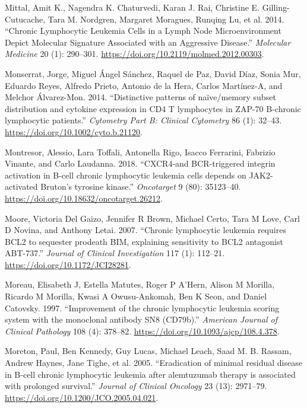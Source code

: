 \documentclass[11pt, a4paper, twosided]{book}
\newenvironment{CSLReferences}%
  {}%
  {\par}
\begin{document}
\begin{CSLReferences}{1}{0}
\leavevmode{}%
Mittal, Amit K., Nagendra K. Chaturvedi, Karan J. Rai, Christine E. Gilling-Cutucache, Tara M. Nordgren, Margaret Moragues, Runqing Lu, et al. 2014. {``{Chronic Lymphocytic Leukemia Cells in a Lymph Node Microenvironment Depict Molecular Signature Associated with an Aggressive Disease}.''} \emph{Molecular Medicine} 20 (1): 290--301. \url{https://doi.org/10.2119/molmed.2012.00303}.

\leavevmode{}%
Monserrat, Jorge, Miguel Ángel Sánchez, Raquel de Paz, David Díaz, Sonia Mur, Eduardo Reyes, Alfredo Prieto, Antonio de la Hera, Carlos Martínez-A, and Melchor Álvarez-Mon. 2014. {``{Distinctive patterns of na{ï}ve/memory subset distribution and cytokine expression in CD4 T lymphocytes in ZAP-70 B-chronic lymphocytic patients}.''} \emph{Cytometry Part B: Clinical Cytometry} 86 (1): 32--43. \url{https://doi.org/10.1002/cyto.b.21120}.

\leavevmode{}%
Montresor, Alessio, Lara Toffali, Antonella Rigo, Isacco Ferrarini, Fabrizio Vinante, and Carlo Laudanna. 2018. {``{CXCR4-and BCR-triggered integrin activation in B-cell chronic lymphocytic leukemia cells depends on JAK2-activated Bruton's tyrosine kinase}.''} \emph{Oncotarget} 9 (80): 35123--40. \url{https://doi.org/10.18632/oncotarget.26212}.

\leavevmode{}%
Moore, Victoria Del Gaizo, Jennifer R Brown, Michael Certo, Tara M Love, Carl D Novina, and Anthony Letai. 2007. {``{Chronic lymphocytic leukemia requires BCL2 to sequester prodeath BIM, explaining sensitivity to BCL2 antagonist ABT-737}.''} \emph{Journal of Clinical Investigation} 117 (1): 112--21. \url{https://doi.org/10.1172/JCI28281}.

\leavevmode{}%
Moreau, Elisabeth J, Estella Matutes, Roger P A'Hern, Alison M Morilla, Ricardo M Morilla, Kwasi A Owusu-Ankomah, Ben K Seon, and Daniel Catovsky. 1997. {``{Improvement of the chronic lymphocytic leukemia scoring system with the monoclonal antibody SN8 (CD79b)}.''} \emph{American Journal of Clinical Pathology} 108 (4): 378--82. \url{https://doi.org/10.1093/ajcp/108.4.378}.

\leavevmode{}%
Moreton, Paul, Ben Kennedy, Guy Lucas, Michael Leach, Saad M. B. Rassam, Andrew Haynes, Jane Tighe, et al. 2005. {``{Eradication of minimal residual disease in B-cell chronic lymphocytic leukemia after alemtuzumab therapy is associated with prolonged survival}.''} \emph{Journal of Clinical Oncology} 23 (13): 2971--79. \url{https://doi.org/10.1200/JCO.2005.04.021}.


\end{CSLReferences}
\end{document}
